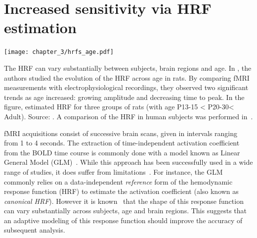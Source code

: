 \newpage
\vspace*{\fill}
\minitoc
\vspace*{\fill}
\newpage


\section{Increased sensitivity via HRF estimation}

\begin{marginfigure}[4cm]
\hspace{-20pt}\texttt{[image: chapter\_3/hrfs\_age.pdf]}
\caption{
	The HRF can vary substantially between subjects, brain regions and age. In \citet{colonnese2007development}, the authors studied the evolution of the HRF across age in rats. By comparing fMRI measurements with electrophysiological recordings, they observed two significant trends as age increased: growing amplitude and decreasing time to peak. In the figure, estimated HRF for three groups of rats (with age P13-15 < P20-30< Adult). Source: \citep{colonnese2007development}. A comparison of the HRF in human subjects was performed in~\citep{badillo2014multi}.
}
\end{marginfigure}


fMRI acquisitions consist of successive brain scans, given in intervals ranging from 1 to 4 seconds. The extraction of time-independent \gls{activation coefficient} from the BOLD time course is commonly done with a model known as Linear General Model
(GLM)~\citep{Friston1995}. While
this approach has been successfully used in a wide range of studies, it does
suffer from limitations~\citep{Poline2012}. For instance, the GLM commonly
relies on a \mbox{data-independent} \emph{reference} form of the hemodynamic response function
(HRF) to estimate the activation coefficient (also known as \emph{canonical HRF}). However it is
known~\citep{Handwerker2004,Badillo2013} that the shape of this response function
can vary substantially across subjects, age and brain regions. This suggests that an adaptive modeling of this
 response function should improve the accuracy of subsequent analysis.



